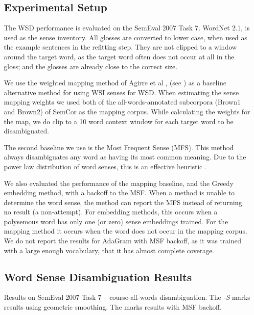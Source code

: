 \documentclass{article} %
\def\parencite{\cite} %
\begin{document}
\subsection {Experimental Setup}
The WSD performance is evaluated on the SemEval 2007 Task 7. 
WordNet 2.1, is used as the sense inventory.
All glosses are converted to lower case, when used as the example sentences in the refitting step. 
They are not clipped to a window around the target word, as the target word often does not occur at all in the gloss; and the glosses are already close to the correct size.

We use the weighted mapping method of Agirre et al \parencite{agirre2006}, (see ) as a baseline alternative method for using WSI senses for WSD.
When estimating the sense mapping weights we used both of the all-words-annotated subcorpora (Brown1 and Brown2) of SemCor as the mapping corpus.
While calculating the weights for the map, we do clip to a 10 word context window for each target word to be disambiguated.

The second baseline we use is the Most Frequent Sense (MFS). This method always disambiguates any word as having its  most common meaning. Due to the power law distribution of word senses, this is an effective heuristic \parencite{Kilgarriff2004}.

We also evaluated the performance of the mapping baseline, and the Greedy embedding method, with a backoff to the MSF. When a method is unable to determine the word sense, the method can report the MFS instead of returning no result (a non-attempt). For embedding methods, this occurs when a polysemous word has only one (or zero) sense embeddings trained. For the mapping method it occurs when the word does not occur in the mapping corpus. We do not report the results for AdaGram with MSF backoff, as it was trained with a large enough vocabulary, that it has almost complete coverage.

\subsection{Word Sense Disambiguation Results} \label{WSDtask}
\begin{table}
	\begin{adjustbox}{max width=\columnwidth}
	\end{adjustbox}

	\caption{Results on SemEval 2007 Task 7 -- course-all-words disambiguation.
	The \emph{-S} marks results using geometric smoothing.
	The \emph{\textasteriskcentered } marks results with MSF backoff.
	} \label{samevalres}
\end{table}
\end{document}
